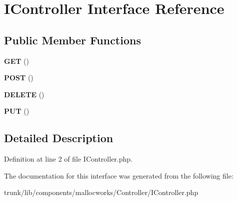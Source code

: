 \hypertarget{interface_i_controller}{
\section{IController Interface Reference}
\label{interface_i_controller}
}
\subsection*{Public Member Functions}
\begin{DoxyCompactItemize}
\item 
\hypertarget{interface_i_controller_a6155e84d5ffcbc4ae944e98f59d49935}{
{\bfseries GET} ()}
\label{interface_i_controller_a6155e84d5ffcbc4ae944e98f59d49935}

\item 
\hypertarget{interface_i_controller_a2a7e865a6254f6af7005197d30ad1cc0}{
{\bfseries POST} ()}
\label{interface_i_controller_a2a7e865a6254f6af7005197d30ad1cc0}

\item 
\hypertarget{interface_i_controller_ab31369bc9c8f31518ed38c1949beb791}{
{\bfseries DELETE} ()}
\label{interface_i_controller_ab31369bc9c8f31518ed38c1949beb791}

\item 
\hypertarget{interface_i_controller_a2a21af1d6aaaa31249485c753b86eba1}{
{\bfseries PUT} ()}
\label{interface_i_controller_a2a21af1d6aaaa31249485c753b86eba1}

\end{DoxyCompactItemize}


\subsection{Detailed Description}


Definition at line 2 of file IController.php.



The documentation for this interface was generated from the following file:\begin{DoxyCompactItemize}
\item 
trunk/lib/components/mallocworks/Controller/IController.php\end{DoxyCompactItemize}
